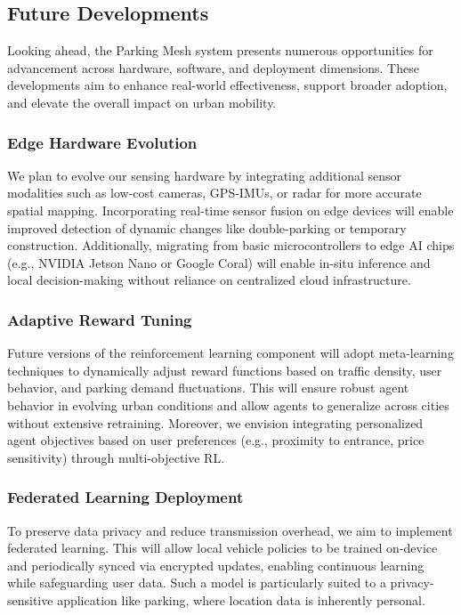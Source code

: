 \subsection{Future Developments}

Looking ahead, the Parking Mesh system presents numerous opportunities for advancement across hardware, software, and deployment dimensions. These developments aim to enhance real-world effectiveness, support broader adoption, and elevate the overall impact on urban mobility.

\subsubsection*{Edge Hardware Evolution}

We plan to evolve our sensing hardware by integrating additional sensor modalities such as low-cost cameras, GPS-IMUs, or radar for more accurate spatial mapping. Incorporating real-time sensor fusion on edge devices will enable improved detection of dynamic changes like double-parking or temporary construction. Additionally, migrating from basic microcontrollers to edge AI chips (e.g., NVIDIA Jetson Nano or Google Coral) will enable in-situ inference and local decision-making without reliance on centralized cloud infrastructure.

\subsubsection*{Adaptive Reward Tuning}

Future versions of the reinforcement learning component will adopt meta-learning techniques to dynamically adjust reward functions based on traffic density, user behavior, and parking demand fluctuations. This will ensure robust agent behavior in evolving urban conditions and allow agents to generalize across cities without extensive retraining. Moreover, we envision integrating personalized agent objectives based on user preferences (e.g., proximity to entrance, price sensitivity) through multi-objective RL.

\subsubsection*{Federated Learning Deployment}

To preserve data privacy and reduce transmission overhead, we aim to implement federated learning. This will allow local vehicle policies to be trained on-device and periodically synced via encrypted updates, enabling continuous learning while safeguarding user data. Such a model is particularly suited to a privacy-sensitive application like parking, where location data is inherently personal.

